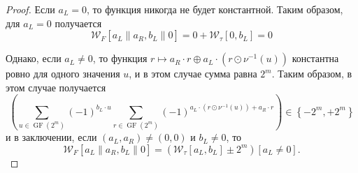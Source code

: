 \begin{proof}
Если $a_{L}=0$, то функция никогда не будет константной. Таким образом, для $a_{L}=0$ получается
$$
\mathcal{W}_{F}\left[a_{L}\left\|a_{R}, b_{L}\right\| 0\right]=0+\mathcal{W}_{\tau}\left[0, b_{L}\right]=0
$$

Однако, если $a_{L} \neq 0$, то функция $r \mapsto a_{R} \cdot r \oplus a_{L} \cdot\left(r \odot \nu^{-1}(u)\right)$ константна ровно для одного значения $u$, и в этом случае сумма равна $2^{m}$. Таким образом, в этом случае получается
$$
\left(\sum_{u \in \operatorname{GF}\left(2^{m}\right)}(-1)^{b_{L} \cdot u} \sum_{r \in \operatorname{GF}\left(2^{m}\right)}(-1)^{a_{L} \cdot\left(r \odot \nu^{-1}(u)\right)+a_{R} \cdot r}\right) \in\left\{-2^{m},+2^{m}\right\}
$$
и в заключении, если $\left(a_{L}, a_{R}\right) \neq(0,0)$ и $b_{L} \neq 0$, то
$$
\mathcal{W}_{F}\left[a_{L}\left\|a_{R}, b_{L}\right\| 0\right]=\left(\mathcal{W}_{\tau}\left[a_{L}, b_{L}\right] \pm 2^{m}\right)\left[a_{L} \neq 0\right] .
$$

\end{proof}